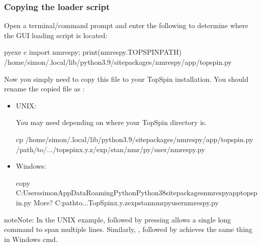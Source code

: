 \documentclass[letterpaper,10pt,english]{sphinxmanual}
\begin{document}
\subsubsection{Copying the loader script}
\label{\detokenize{gui/topspin_install:copying-the-loader-script}}
\sphinxAtStartPar
Open a terminal/command prompt and enter the following to
determine where the GUI loading script is located:

\begin{sphinxVerbatim}[commandchars=\\\{\}]
\PYGZdl{} \PYGZlt{}pyexe\PYGZgt{} \PYGZhy{}c \PYGZdq{}import nmrespy; print(nmrespy.TOPSPINPATH)\PYGZdq{}
/home/simon/.local/lib/python3.9/site\PYGZhy{}packages/nmrespy/app/\PYGZus{}topspin.py
\end{sphinxVerbatim}

\sphinxAtStartPar
Now you simply need to copy this file to your TopSpin installation. You should
rename the copied file as :
\begin{itemize}
\item {} 
\sphinxAtStartPar
UNIX:

\sphinxAtStartPar
You may need  depending on where your TopSpin directory is.

\begin{sphinxVerbatim}[commandchars=\\\{\}]
\PYGZdl{} cp /home/simon/.local/lib/python3.9/site\PYGZhy{}packages/nmrespy/app/\PYGZus{}topspin.py \PYGZbs{}
\PYGZgt{} /path/to/.../topspinx.y.z/exp/stan/nmr/py/user/nmrespy.py
\end{sphinxVerbatim}

\item {} 
\sphinxAtStartPar
Windows:

\begin{sphinxVerbatim}[commandchars=\\\{\}]
\PYGZgt{} copy C:\PYGZbs{}Users\PYGZbs{}simon\PYGZbs{}AppData\PYGZbs{}Roaming\PYGZbs{}Python\PYGZbs{}Python38\PYGZbs{}site\PYGZhy{}packages\PYGZbs{}nmrespy\PYGZbs{}app\PYGZbs{}\PYGZus{}topspin.py \PYGZca{}
More? C:\PYGZbs{}path\PYGZbs{}to\PYGZbs{}...\PYGZbs{}TopSpinx.y.z\PYGZbs{}exp\PYGZbs{}stan\PYGZbs{}nmr\PYGZbs{}py\PYGZbs{}user\PYGZbs{}nmrespy.py
\end{sphinxVerbatim}

\end{itemize}

\begin{sphinxadmonition}{note}{Note:}
\sphinxAtStartPar
In the UNIX example, \sphinxcode{\sphinxupquote{\textbackslash{}}} followed by pressing  allows
a single long command to span multiple lines. Similarly, \sphinxcode{\sphinxupquote{\textasciicircum{}}}, followed
by  achieves the same thing in Windows cmd.
\end{sphinxadmonition}
\end{document}
